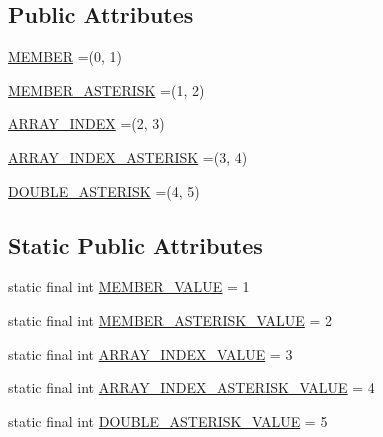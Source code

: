 \subsection*{Public Attributes}
\begin{DoxyCompactItemize}
\item 
\mbox{\hyperlink{enumcom_1_1mysql_1_1cj_1_1x_1_1protobuf_1_1_mysqlx_expr_1_1_document_path_item_1_1_type_a3e62a5611093dba434fb57e24765f909}{M\+E\+M\+B\+ER}} =(0, 1)
\item 
\mbox{\hyperlink{enumcom_1_1mysql_1_1cj_1_1x_1_1protobuf_1_1_mysqlx_expr_1_1_document_path_item_1_1_type_ada63277ec8911a0f8589dc3b1163d710}{M\+E\+M\+B\+E\+R\+\_\+\+A\+S\+T\+E\+R\+I\+SK}} =(1, 2)
\item 
\mbox{\hyperlink{enumcom_1_1mysql_1_1cj_1_1x_1_1protobuf_1_1_mysqlx_expr_1_1_document_path_item_1_1_type_ad8a3c12296288cb36613aa2e6f487ea4}{A\+R\+R\+A\+Y\+\_\+\+I\+N\+D\+EX}} =(2, 3)
\item 
\mbox{\hyperlink{enumcom_1_1mysql_1_1cj_1_1x_1_1protobuf_1_1_mysqlx_expr_1_1_document_path_item_1_1_type_a050875de30c80a426b3bc303b9d70000}{A\+R\+R\+A\+Y\+\_\+\+I\+N\+D\+E\+X\+\_\+\+A\+S\+T\+E\+R\+I\+SK}} =(3, 4)
\item 
\mbox{\hyperlink{enumcom_1_1mysql_1_1cj_1_1x_1_1protobuf_1_1_mysqlx_expr_1_1_document_path_item_1_1_type_a494d1054c235a1e3a6ac79bf42fee4f9}{D\+O\+U\+B\+L\+E\+\_\+\+A\+S\+T\+E\+R\+I\+SK}} =(4, 5)
\end{DoxyCompactItemize}
\subsection*{Static Public Attributes}
\begin{DoxyCompactItemize}
\item 
static final int \mbox{\hyperlink{enumcom_1_1mysql_1_1cj_1_1x_1_1protobuf_1_1_mysqlx_expr_1_1_document_path_item_1_1_type_ae83251ee3879d461332876c26a39cb2d}{M\+E\+M\+B\+E\+R\+\_\+\+V\+A\+L\+UE}} = 1
\item 
static final int \mbox{\hyperlink{enumcom_1_1mysql_1_1cj_1_1x_1_1protobuf_1_1_mysqlx_expr_1_1_document_path_item_1_1_type_a2e157ddfc754d4752aa7712df8252251}{M\+E\+M\+B\+E\+R\+\_\+\+A\+S\+T\+E\+R\+I\+S\+K\+\_\+\+V\+A\+L\+UE}} = 2
\item 
static final int \mbox{\hyperlink{enumcom_1_1mysql_1_1cj_1_1x_1_1protobuf_1_1_mysqlx_expr_1_1_document_path_item_1_1_type_a1402cdbaac31a487aed683701794b283}{A\+R\+R\+A\+Y\+\_\+\+I\+N\+D\+E\+X\+\_\+\+V\+A\+L\+UE}} = 3
\item 
static final int \mbox{\hyperlink{enumcom_1_1mysql_1_1cj_1_1x_1_1protobuf_1_1_mysqlx_expr_1_1_document_path_item_1_1_type_a81f458788366e3549f0efea262976696}{A\+R\+R\+A\+Y\+\_\+\+I\+N\+D\+E\+X\+\_\+\+A\+S\+T\+E\+R\+I\+S\+K\+\_\+\+V\+A\+L\+UE}} = 4
\item 
static final int \mbox{\hyperlink{enumcom_1_1mysql_1_1cj_1_1x_1_1protobuf_1_1_mysqlx_expr_1_1_document_path_item_1_1_type_ac5606ca8a0f37597620e18da44413949}{D\+O\+U\+B\+L\+E\+\_\+\+A\+S\+T\+E\+R\+I\+S\+K\+\_\+\+V\+A\+L\+UE}} = 5
\end{DoxyCompactItemize}


